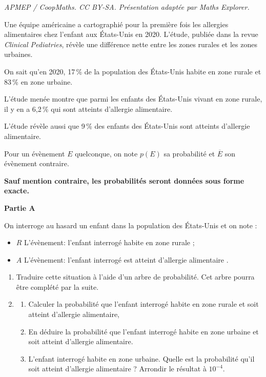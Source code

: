 \documentclass[10pt]{article}
\begin{document}
\noindent\textit{APMEP / CoopMaths. CC BY-SA. Présentation adaptée par Maths Explorer.}\par\medskip
\medskip

Une équipe américaine a cartographié pour la première fois les allergies alimentaires chez l'enfant aux États-Unis en 2020. L'étude, publiée dans la revue \emph{Clinical Pediatries}, révèle une différence nette entre les zones rurales et les zones urbaines.

\smallskip

On sait qu'en 2020, 17\,\% de la population des États-Unis habite en zone rurale et 83\,\% en zone urbaine.

\smallskip

L'étude menée montre que parmi les enfants des États-Unis vivant en zone rurale, il y en a 6,2\,\% qui sont atteints d'allergie alimentaire.

L'étude révèle aussi que 9\,\% des enfants des États-Unis sont atteints d'allergie alimentaire. 

\smallskip

Pour un évènement $E$ quelconque, on note $p(E)$ sa probabilité et $\overline{E}$ son évènement contraire.

\textbf{Sauf mention contraire, les probabilités seront données sous forme exacte.}

\medskip

\textbf{Partie A}

\medskip

On interroge au hasard un enfant dans la population des États-Unis et on note :

\begin{itemize}[label=$\bullet~$]
\item $R$ L'évènement: \og l'enfant interrogé habite en zone rurale \fg ;
\item $A$ L'évènement: \og l'enfant interrogé est atteint d'allergie alimentaire \fg.
\end{itemize}

\medskip

\begin{enumerate}
\item Traduire cette situation à l'aide d'un arbre de probabilité. Cet arbre pourra être complété par la suite.
\item 
	\begin{enumerate}
		\item Calculer la probabilité que l'enfant interrogé habite en zone rurale et soit atteint d'allergie alimentaire,
		\item En déduire la probabilité que l'enfant interrogé habite en zone urbaine et soit atteint d'allergie alimentaire.
		\item L'enfant interrogé habite en zone urbaine. Quelle est la probabilité qu'il soit atteint d'allergie alimentaire ? Arrondir le résultat à $10^{-4}$.
	\end{enumerate}
\end{enumerate}
\end{document}
